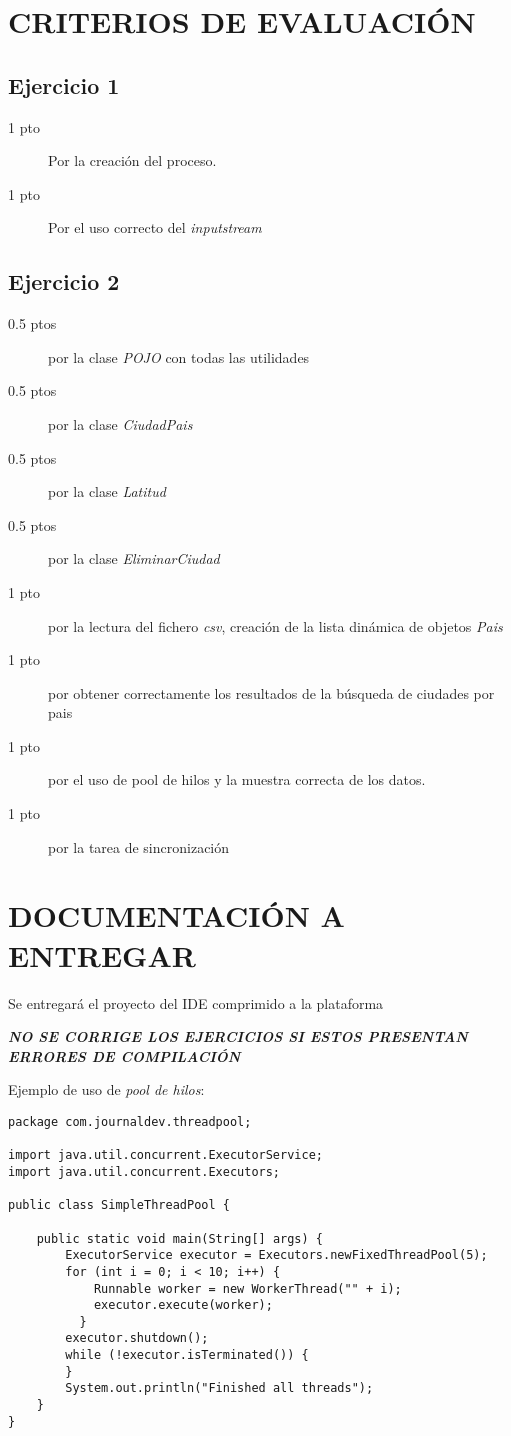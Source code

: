 \documentclass[addpoints]{exam}
\begin{document}
\section{CRITERIOS DE EVALUACIÓN}




\subsection{Ejercicio 1} 
\begin{description}
\item[1 pto] Por la creación del proceso.
\item[1 pto] Por el uso correcto del \emph{inputstream}
\end{description}
\subsection{Ejercicio 2}
\begin{description}
\item[0.5 ptos] por la clase \emph{POJO} con todas las utilidades
\item[0.5 ptos] por la clase \emph{CiudadPais}
\item[0.5 ptos] por la clase \emph{Latitud}
\item[0.5 ptos] por la clase \emph{EliminarCiudad}
\item[1 pto] por la lectura del fichero \emph{csv}, creación de la lista dinámica de objetos \emph{Pais}
\item[1 pto] por obtener correctamente los resultados de la búsqueda de ciudades por pais
\item[1 pto] por el uso de pool de hilos y la muestra correcta de los datos.
\item[1 pto] por la tarea de sincronización

\end{description}
\section{DOCUMENTACIÓN A ENTREGAR}
Se entregará el proyecto del IDE comprimido a la plataforma
\vspace{0.5cm}
\begin{center}
\begin{large}
\textbf{\textit{NO SE CORRIGE LOS EJERCICIOS SI ESTOS PRESENTAN ERRORES DE COMPILACIÓN}
}\end{large}
\end{center}
\newpage
Ejemplo de uso de \emph{pool de hilos}:
\begin{lstlisting}
package com.journaldev.threadpool;

import java.util.concurrent.ExecutorService;
import java.util.concurrent.Executors;

public class SimpleThreadPool {

    public static void main(String[] args) {
        ExecutorService executor = Executors.newFixedThreadPool(5);
        for (int i = 0; i < 10; i++) {
            Runnable worker = new WorkerThread("" + i);
            executor.execute(worker);
          }
        executor.shutdown();
        while (!executor.isTerminated()) {
        }
        System.out.println("Finished all threads");
    }
}
\end{lstlisting}
\end{document}
